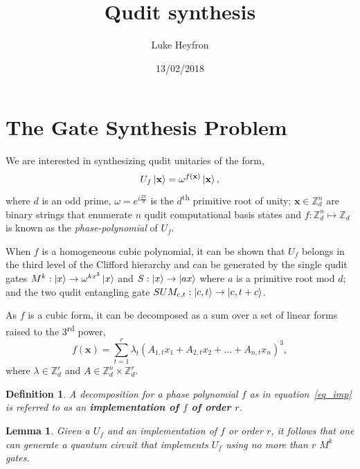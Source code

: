 \documentclass[11pt,a4paper]{article}
\title{Qudit synthesis}
\date{13/02/2018}
\author{Luke Heyfron}
\newtheorem{definition}{Definition}
\newtheorem{lemma}{Lemma}
\begin{document}
	\maketitle
	\tableofcontents
	
	\section{The Gate Synthesis Problem}
	
	We are interested in synthesizing qudit unitaries of the form,
	\begin{equation}
	U_f\ket{\mathbf{x}} = \omega^{f(\mathbf{x})}\ket{\mathbf{x}},
	\end{equation}
	where $d$ is an odd prime, $\omega = e^{i\frac{2\pi}{d}}$ is the $d$\textsuperscript{th} primitive root of unity; $\mathbf{x}\in \mathbb{Z}_d^n$ are binary strings that enumerate $n$ qudit computational basis states and $f: \mathbb{Z}_d^n \mapsto \mathbb{Z}_d$ is known as the \emph{phase-polynomial} of $U_f$.
	
	When $f$ is a homogeneous cubic polynomial, it can be shown that $U_f$ belongs in the third level of the Clifford hierarchy and can be generated by the single qudit gates $M^k:\ket{x} \rightarrow \omega^{kx^3}\ket{x}$ and $S:\ket{x} \rightarrow \ket{ax}$ where $a$ is a primitive root mod $d$; and the two qudit entangling gate $SUM_{c,t}: \ket{c,t} \rightarrow \ket{c,t+c}$.
	
	As $f$ is a cubic form, it can be decomposed as a sum over a set of linear forms raised to the $3$\textsuperscript{rd} power,
	\begin{equation}
	\label{eq_imp}
	f(\mathbf{x}) = \sum_{t=1}^r \lambda_t (A_{1,t}x_1 + A_{2,t}x_2 + \dots + A_{n,t}x_n)^3,
	\end{equation}
	where $\lambda \in \mathbb{Z}_d^r$ and $A \in \mathbb{Z}_d^n \times \mathbb{Z}_d^r$.
	\begin{definition}
		A decomposition for a phase polynomial $f$ as in equation~\eqref{eq_imp} is referred to as an \textbf{\emph{implementation of $f$ of order $r$}}.
	\end{definition}
	
	\begin{lemma}
		Given a $U_f$ and an implementation of $f$ or order $r$, it follows that one can generate a quantum circuit that implements $U_f$ using no more than $r$ $M^k$ gates.
	\end{lemma}
\end{document}
